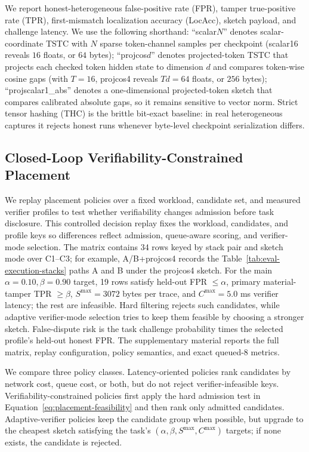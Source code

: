 \documentclass[sigplan,screen,review,anonymous]{acmart}
\begin{document}
We report honest-heterogeneous false-positive rate (FPR), tamper true-positive
rate (TPR), first-mismatch localization accuracy (LocAcc), sketch payload, and
challenge latency. We use the following shorthand: ``scalar\(N\)'' denotes
scalar-coordinate TSTC with \(N\) sparse token-channel samples per checkpoint
(scalar16 reveals \(16\) floats, or \(64\) bytes); ``projcos\(d\)'' denotes
projected-token TSTC that projects each checked token hidden state to dimension
\(d\) and compares token-wise cosine gaps (with \(T=16\), projcos4 reveals
\(T d=64\) floats, or \(256\) bytes); ``projscalar1\_abs'' denotes a
one-dimensional projected-token sketch that compares calibrated absolute gaps,
so it remains sensitive to vector norm. Strict tensor hashing (THC) is the
brittle bit-exact baseline: in real heterogeneous captures it rejects honest
runs whenever byte-level checkpoint serialization differs.

\subsection{Closed-Loop Verifiability-Constrained Placement}
\label{subsec:eval-placement}

We replay placement policies over a fixed workload, candidate set, and measured
verifier profiles to test whether verifiability changes admission before task
disclosure. This controlled decision replay fixes the workload, candidates, and
profile keys so differences reflect admission, queue-aware scoring, and
verifier-mode selection. The matrix contains 34 rows keyed by stack pair and
sketch mode over C1--C3; for example, A/B+\allowbreak{}projcos4 records the
Table~\ref{tab:eval-execution-stacks} paths A and B under the projcos4 sketch.
For the main \(\alpha=0.10,\beta=0.90\) target, 19 rows satisfy held-out FPR
\(\le\alpha\), primary material-tamper TPR \(\ge\beta\),
\(S^{\max}=3072\) bytes per trace, and \(C^{\max}=5.0\) ms verifier latency;
the rest are infeasible. Hard filtering rejects such candidates, while
adaptive verifier-mode selection tries to keep them feasible by choosing a
stronger sketch. False-dispute risk is the task challenge probability times
the selected profile's held-out honest FPR. The supplementary material reports
the full matrix, replay configuration, policy semantics, and exact queued-8
metrics.

We compare three policy classes. Latency-oriented policies rank candidates by
network cost, queue cost, or both, but do not reject verifier-infeasible keys.
Verifiability-constrained policies first apply the hard admission test in
Equation~\ref{eq:placement-feasibility} and then rank only admitted candidates.
Adaptive-verifier policies keep the candidate group when possible, but upgrade
to the cheapest sketch satisfying the task's
\((\alpha,\beta,S^{\max},C^{\max})\) targets; if none exists, the candidate is
rejected.
\end{document}
